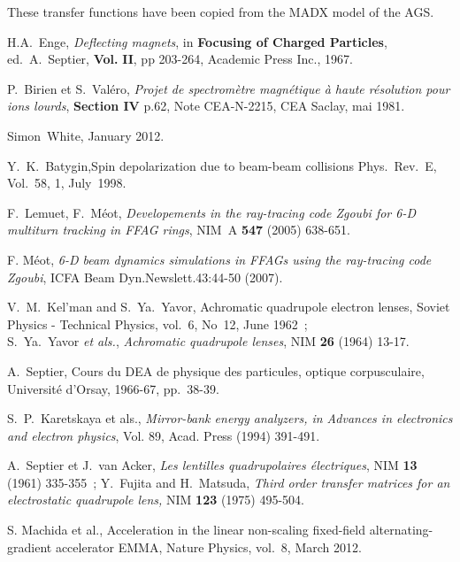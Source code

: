 \begin{thebibliography}{99}
 These transfer functions have been copied from the MADX model of the AGS.

 H.A.~Enge, \textsl{Deflecting magnets}, in \textbf{Focusing of 
Charged Particles}, ed.~A.~Septier, \textbf{Vol.}  \textbf{II}, pp 203-264, Academic
Press Inc., 1967.

 P.~Birien et S.~Val\'ero, \textsl{Projet de spectrom\`etre 
magn\'etique \`a haute r\'esolution pour ions lourds}, \textbf{Section IV} 
p.62, Note CEA-N-2215, CEA Saclay, mai 1981.



\newpage



 Simon~White, January 2012. 

 Y.~K.~Batygin,Spin depolarization due to beam-beam collisions
Phys.~Rev.~E, Vol.~58,  1, July~1998. 

 F.~Lemuet, F.~M\'eot, \textsl{Developements in the ray-tracing code Zgoubi for 
6-D multiturn tracking in FFAG rings}, NIM~A \textbf{547} (2005) 638-651. 

 F. M\'eot,  
\textsl{6-D beam dynamics simulations in FFAGs using the ray-tracing code Zgoubi}, 
ICFA Beam Dyn.Newslett.43:44-50 (2007).

 V.~M.~Kel'man and S.~Ya.~Yavor, Achromatic
quadrupole electron lenses, Soviet Physics - Technical Physics, vol.~6, No~12, June 1962~; \\
S.~Ya.~Yavor \textsl{et als.}, \textsl{Achromatic quadrupole lenses}, NIM \textbf{26} (1964) 13-17. 

 A.~Septier, Cours du DEA de physique des
particules, optique corpusculaire, Universit\'e d'Orsay, 1966-67, pp.~38-39.  

 S.~P.~Karetskaya et als., 
\textsl{Mirror-bank energy analyzers, in Advances in electronics and electron physics}, 
Vol. 89, Acad. Press (1994) 391-491. 

 A.~Septier et J.~van Acker, \textsl{Les lentilles quadrupolaires 
\'electriques}, NIM \textbf{13} (1961) 335-355~; Y.~Fujita and H.~Matsuda, 
\textsl{Third order transfer matrices for an electrostatic quadrupole lens,} 
NIM \textbf{123} (1975) 495-504. 

S. Machida et al., 
Acceleration in the linear non-scaling fixed-field alternating-gradient accelerator EMMA, 
Nature Physics, vol.~8, March 2012.


\end{thebibliography}
